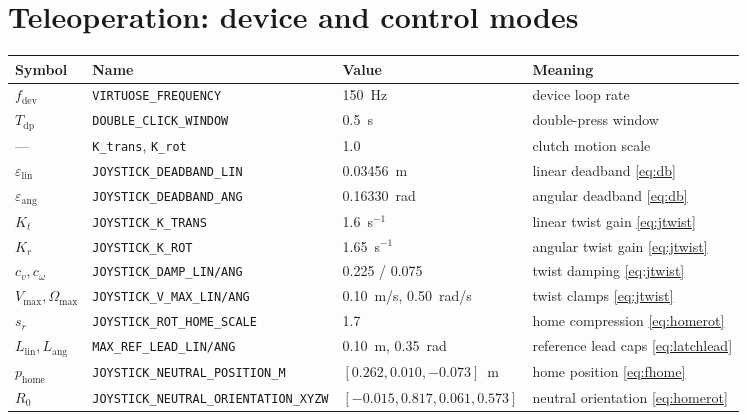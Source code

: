 \documentclass[12pt,a4paper,twoside,openright]{report}
\begin{document}
\section{Teleoperation: device and control modes}
\begin{tabularx}{\linewidth}{@{}l>{\raggedright\arraybackslash}p{4.3cm}lX@{}}
\toprule
Symbol & Name & Value & Meaning \\
\midrule
$f_{\text{dev}}$ & \texttt{VIRTUOSE\_FREQUENCY} & 150~Hz & device loop rate \\
$T_{\text{dp}}$ & \texttt{DOUBLE\_CLICK\_WINDOW} & 0.5~s & double-press window \\
--- & \texttt{K\_trans}, \texttt{K\_rot} & 1.0 & clutch motion scale \\
$\varepsilon_{\text{lin}}$ & \texttt{JOYSTICK\_DEADBAND\_LIN} & 0.03456~m & linear deadband \eqref{eq:db} \\
$\varepsilon_{\text{ang}}$ & \texttt{JOYSTICK\_DEADBAND\_ANG} & 0.16330~rad & angular deadband \eqref{eq:db} \\
$K_t$ & \texttt{JOYSTICK\_K\_TRANS} & 1.6~s$^{-1}$ & linear twist gain \eqref{eq:jtwist} \\
$K_r$ & \texttt{JOYSTICK\_K\_ROT} & 1.65~s$^{-1}$ & angular twist gain \eqref{eq:jtwist} \\
$c_v, c_\omega$ & \texttt{JOYSTICK\_DAMP\_LIN/ANG} & 0.225 / 0.075 & twist damping \eqref{eq:jtwist} \\
$V_{\max}, \Omega_{\max}$ & \texttt{JOYSTICK\_V\_MAX\_LIN/ANG} & 0.10~m/s, 0.50~rad/s & twist clamps \eqref{eq:jtwist} \\
$s_r$ & \texttt{JOYSTICK\_ROT\_HOME\_SCALE} & 1.7 & home compression \eqref{eq:homerot} \\
$L_{\text{lin}}, L_{\text{ang}}$ & \texttt{MAX\_REF\_LEAD\_LIN/ANG} & 0.10~m, 0.35~rad & reference lead caps \eqref{eq:latchlead} \\
$p_{\text{home}}$ & \texttt{JOYSTICK\_NEUTRAL\_\allowbreak POSITION\_M} & $[0.262, 0.010, -0.073]$~m & home position \eqref{eq:fhome} \\
$R_0$ & \texttt{JOYSTICK\_NEUTRAL\_\allowbreak ORIENTATION\_XYZW} & $[-0.015, 0.817, 0.061, 0.573]$ & neutral orientation \eqref{eq:homerot} \\
\bottomrule
\end{tabularx}
\end{document}
